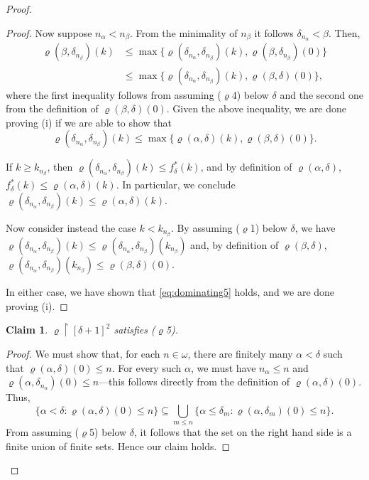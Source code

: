 \documentclass[]{amsart}
\newtheorem{claim}{Claim}[theorem]
\theoremstyle{definition}
\theoremstyle{remark}
\begin{document}
\begin{proof}
\begin{proof}
Now suppose $n_\alpha < n_\beta$. From the minimality of $n_\beta$ it follows $\delta_{n_\alpha} < \beta$. Then,
\begin{align*}
\varrho(\beta, \delta_{n_\beta})(k) &\le \max \{ \varrho(\delta_{n_\alpha}, \delta_{n_\beta})(k), \varrho(\beta, \delta_{n_\beta})(0)\} \\
&\le \max \{\varrho(\delta_{n_\alpha}, \delta_{n_\beta})(k), \varrho(\beta, \delta)(0)\},
\end{align*}
where the first inequality follows from assuming ($\varrho$4) below $\delta$ and the second one from the definition of $\varrho(\beta, \delta)(0)$. Given the above inequality, we are done proving (i) if we are able to show that 
\begin{equation}\label{eq:dominating5}
\varrho(\delta_{n_\alpha}, \delta_{n_\beta})(k) \le \max\{\varrho(\alpha, \delta)(k), \varrho(\beta, \delta)(0)\}.
\end{equation}

If $k \ge k_{n_\beta}$, then $\varrho(\delta_{n_\alpha}, \delta_{n_\beta})(k) \le f^*_\delta (k)$, and by definition of  $\varrho(\alpha, \delta)$, $f^*_\delta (k) \le \varrho(\alpha, \delta)(k)$. In particular, we conclude $\varrho(\delta_{n_\alpha}, \delta_{n_\beta})(k) \le \varrho(\alpha, \delta)(k)$. 

Now consider instead the case $k < k_{n_\beta}$. By assuming ($\varrho$1) below $\delta$, we have $\varrho(\delta_{n_\alpha}, \delta_{n_\beta})(k) \le \varrho(\delta_{n_\alpha}, \delta_{n_\beta})(k_{n_\beta})$ and, by definition of $\varrho(\beta, \delta)$, $ \varrho(\delta_{n_\alpha}, \delta_{n_\beta})(k_{n_\beta}) \le \varrho(\beta, \delta)(0)$. 

In either case, we have shown that \eqref{eq:dominating5} holds, and we are done proving (i).
\end{proof}
\begin{claim}
$\varrho \upharpoonright [\delta + 1]^2$ satisfies {\upshape ($\varrho$5)}.
\end{claim}
\begin{proof}
We must show that, for each $n \in \omega$, there are finitely many $\alpha < \delta$ such that  $\varrho(\alpha, \delta)(0) \le n$. For every such $\alpha$, we must have $n_\alpha \le n$ and $\varrho(\alpha, \delta_{n_\alpha})(0) \le n$---this follows directly from the definition of $\varrho(\alpha, \delta)(0)$. Thus,
\[
\{\alpha < \delta : \varrho(\alpha, \delta)(0) \le n\} \subseteq \bigcup_{m \le n}\{\alpha \le \delta_m : \varrho(\alpha, \delta_m)(0) \le n\}.
\]
From assuming ($\varrho$5) below $\delta$, it follows that the set on the right hand side is a finite union of finite sets. Hence our claim holds.
\end{proof}


\end{proof}
\end{document}
